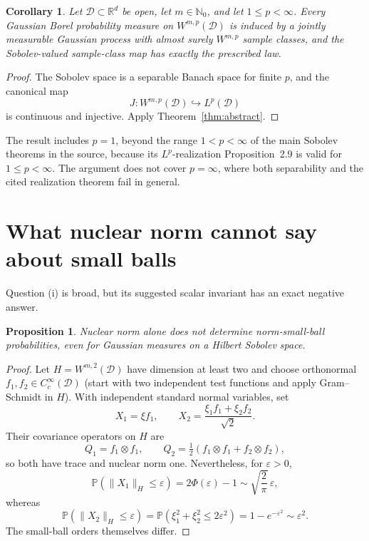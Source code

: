 \documentclass[11pt]{article}
\newtheorem{corollary}[theorem]{Corollary}
\newtheorem{proposition}[theorem]{Proposition}
\begin{document}
\begin{corollary}\label{cor:sobolev}
Let \(\mathcal D\subset\mathbb R^d\) be open, let \(m\in\mathbb N_0\), and
let \(1\le p<\infty\).  Every Gaussian Borel probability measure on
\(W^{m,p}(\mathcal D)\) is induced by a jointly measurable Gaussian
process with almost surely \(W^{m,p}\) sample classes, and the
Sobolev-valued sample-class map has exactly the prescribed law.
\end{corollary}

\begin{proof}
The Sobolev space is a separable Banach space for finite \(p\), and the
canonical map
\[
 J:W^{m,p}(\mathcal D)\hookrightarrow L^p(\mathcal D)
\]
is continuous and injective.  Apply Theorem~\ref{thm:abstract}.
\end{proof}

The result includes \(p=1\), beyond the range \(1<p<\infty\) of the main
Sobolev theorems in the source, because its \(L^p\)-realization
Proposition~2.9 is valid for \(1\le p<\infty\).  The argument does not
cover \(p=\infty\), where both separability and the cited realization
theorem fail in general.

\section{What nuclear norm cannot say about small balls}

Question (i) is broad, but its suggested scalar invariant has an exact
negative answer.

\begin{proposition}\label{prop:trace}
Nuclear norm alone does not determine norm-small-ball probabilities, even
for Gaussian measures on a Hilbert Sobolev space.
\end{proposition}

\begin{proof}
Let \(H=W^{m,2}(\mathcal D)\) have dimension at least two and choose
orthonormal \(f_1,f_2\in C_c^\infty(\mathcal D)\) (start with two
independent test functions and apply Gram--Schmidt in \(H\)).  With
independent standard normal variables,
set
\[
 X_1=\xi f_1,\qquad
 X_2=\frac{\xi_1f_1+\xi_2f_2}{\sqrt2}.
\]
Their covariance operators on \(H\) are
\[
 Q_1=f_1\otimes f_1,\qquad
 Q_2=\tfrac12(f_1\otimes f_1+f_2\otimes f_2),
\]
so both have trace and nuclear norm one.  Nevertheless, for
\(\varepsilon>0\),
\[
 \mathbb P(\|X_1\|_H\le\varepsilon)
 =2\Phi(\varepsilon)-1
 \sim\sqrt{\frac2\pi}\,\varepsilon,
\]
whereas
\[
 \mathbb P(\|X_2\|_H\le\varepsilon)
 =\mathbb P(\xi_1^2+\xi_2^2\le2\varepsilon^2)
 =1-e^{-\varepsilon^2}
 \sim\varepsilon^2.
\]
The small-ball orders themselves differ.
\end{proof}
\end{document}
